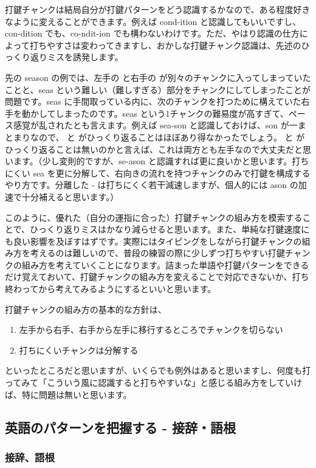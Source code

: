 打鍵チャンクは結局自分が打鍵パターンをどう認識するかなので、ある程度好きなように変えることができます。例えば cond-ition と認識してもいいですし、con-dition でも、co-ndit-ion でも構わないわけです。ただ、やはり認識の仕方によって打ちやすさは変わってきますし、おかしな打鍵チャンク認識は、先述のひっくり返りミスを誘発します。

先の season の例では、左手の  と右手の  が別々のチャンクに入ってしまっていたことと、seas という難しい（難しすぎる）部分をチャンクにしてしまったことが問題です。seas に手間取っている内に、次のチャンクを打つために構えていた右手を動かしてしまったのです。seas という1チャンクの難易度が高すぎて、ペース感覚が乱されたとも言えます。例えば sea-son と認識しておけば、son が一まとまりなので、 と  がひっくり返ることはほぼあり得なかったでしょう。 と  がひっくり返ることは無いのかと言えば、これは両方とも左手なので大丈夫だと思います。（少し変則的ですが、se-ason と認識すれば更に良いかと思います。打ちにくい sea を更に分解して、右向きの流れを持つチャンクのみで打鍵を構成するやり方です。分離した - は打ちにくく若干減速しますが、個人的には ason の加速で十分補えると思います。）

このように、優れた（自分の運指に合った）打鍵チャンクの組み方を模索することで、ひっくり返りミスはかなり減らせると思います。また、単純な打鍵速度にも良い影響を及ぼすはずです。実際にはタイピングをしながら打鍵チャンクの組み方を考えるのは難しいので、普段の練習の際に少しずつ打ちやすい打鍵チャンクの組み方を考えていくことになります。詰まった単語や打鍵パターンをできるだけ覚えておいて、打鍵チャンクの組み方を変えることで対応できないか、打ち終わってから考えてみるようにするといいと思います。

打鍵チャンクの組み方の基本的な方針は、
\begin{enumerate}
 \item 左手から右手、右手から左手に移行するところでチャンクを切らない
 \item 打ちにくいチャンクは分解する
\end{enumerate}
といったところだと思いますが、いくらでも例外はあると思いますし、何度も打ってみて「こういう風に認識すると打ちやすいな」と感じる組み方をしていけば、特に問題は無いと思います。

\subsection{英語のパターンを把握する - 接辞・語根}

\subsubsection*{接辞、語根}

